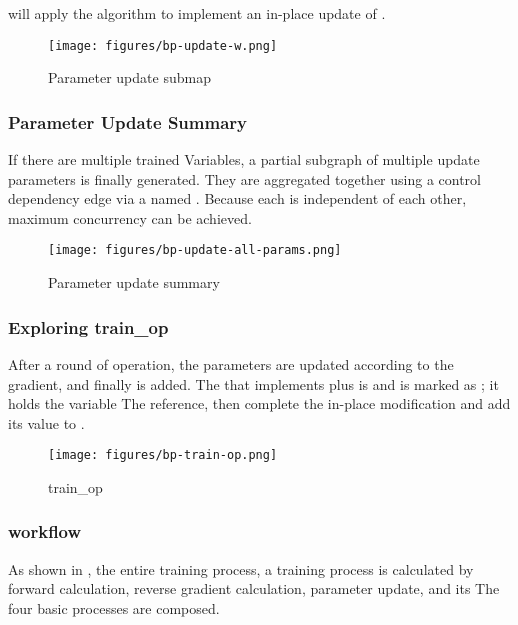 \begin{content}
 will apply the  algorithm to implement an in-place update of .

\begin{figure}[!h]
\centering
\texttt{[image: figures/bp-update-w.png]}
\caption{Parameter update submap}
 \label{fig:bp-update-w}
\end{figure}

\subsubsection{Parameter Update Summary}

If there are multiple trained Variables, a partial subgraph of multiple update parameters is finally generated. They are aggregated together using a control dependency edge via a  named . Because each  is independent of each other, maximum concurrency can be achieved.

\begin{figure}[!h]
\centering
\texttt{[image: figures/bp-update-all-params.png]}
\caption{Parameter update summary}
 \label{fig:bp-update-all-params}
\end{figure}

\subsubsection{Exploring train\_op}

After a round of  operation, the parameters are updated according to the gradient, and finally  is added. The  that implements  plus  is  and is marked as ; it holds the  variable The reference, then complete the in-place modification and add its value to .

\begin{figure}[!h]
\centering
\texttt{[image: figures/bp-train-op.png]}
\caption{train\_op}
 \label{fig:bp-train-op}
\end{figure}

\subsubsection{workflow}

As shown in , the entire training process, a  training process is calculated by forward calculation, reverse gradient calculation, parameter update, and its  The four basic processes are composed.


\end{content}
